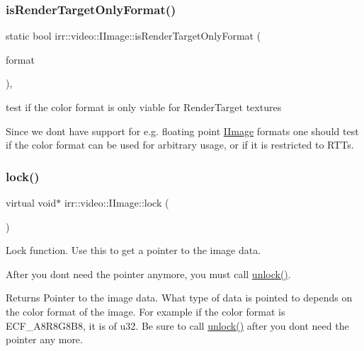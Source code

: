 \subsubsection{\texorpdfstring{is\+Render\+Target\+Only\+Format()}{isRenderTargetOnlyFormat()}\hspace{0.1cm}{\footnotesize\ttfamily [2/2]}}
{\footnotesize\ttfamily static bool irr\+::video\+::\+I\+Image\+::is\+Render\+Target\+Only\+Format (\begin{DoxyParamCaption}\item[{const \hyperlink{namespaceirr_1_1video_a1d5e487888c32b1674a8f75116d829ed}{E\+C\+O\+L\+O\+R\+\_\+\+F\+O\+R\+M\+AT}}]{format }\end{DoxyParamCaption})\hspace{0.3cm}{\ttfamily [inline]}, {\ttfamily [static]}}



test if the color format is only viable for Render\+Target textures 

Since we don\textquotesingle{}t have support for e.\+g. floating point \hyperlink{classirr_1_1video_1_1IImage}{I\+Image} formats one should test if the color format can be used for arbitrary usage, or if it is restricted to R\+T\+Ts. \mbox{\label{classirr_1_1video_1_1IImage_a5c4b0b5fa2a5f253f93c1b038e20d204}} 
\subsubsection{\texorpdfstring{lock()}{lock()}\hspace{0.1cm}{\footnotesize\ttfamily [1/2]}}
{\footnotesize\ttfamily virtual void$\ast$ irr\+::video\+::\+I\+Image\+::lock (\begin{DoxyParamCaption}{ }\end{DoxyParamCaption})\hspace{0.3cm}{\ttfamily [pure virtual]}}



Lock function. Use this to get a pointer to the image data. 

After you don\textquotesingle{}t need the pointer anymore, you must call \hyperlink{classirr_1_1video_1_1IImage_ad0f902d74a948ee66be2d70dc90ed38d}{unlock()}. \begin{DoxyReturn}{Returns}
Pointer to the image data. What type of data is pointed to depends on the color format of the image. For example if the color format is E\+C\+F\+\_\+\+A8\+R8\+G8\+B8, it is of u32. Be sure to call \hyperlink{classirr_1_1video_1_1IImage_ad0f902d74a948ee66be2d70dc90ed38d}{unlock()} after you don\textquotesingle{}t need the pointer any more. 
\end{DoxyReturn}
\mbox{\label{classirr_1_1video_1_1IImage_a5c4b0b5fa2a5f253f93c1b038e20d204}} 
